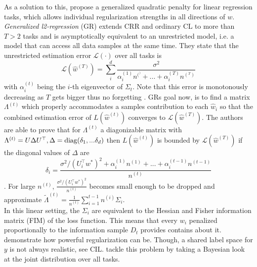 As a solution to this, \cite{zhao2024statisticaltheoryregularizationbasedcontinual} propose a generalized quadratic penalty for linear regression tasks, which allows individual regularization strengths in all directions of $w$.\\
\textit{Generalized l2-regression} (GR) \cite{zhao2024statisticaltheoryregularizationbasedcontinual} extends CRR and ordinary CL to more than $T > 2$ tasks and is asymptotically equivalent to an unrestricted model, i.e. a model that can access all data samples at the same time. They state that the unrestricted estimation error $\mathcal{L}(\cdot)$ over all tasks is
\begin{equation}\label{oracle}
	\mathcal{L}(\hat{w}^{(T)}) = \sum_{i}^{d} \frac{\sigma^2}{\alpha^{(1)}_i n^{(^)}+ ... + \alpha^{(T)}_i n^{(^T)}}
\end{equation}
with $\alpha^{(t)}_i$ being the $i$-th eigenvector of $\Sigma_t$. Note that this error is monotonously decreasing as $T$ gets bigger thus no forgetting \cite{zhao2024statisticaltheoryregularizationbasedcontinual}. GRs goal now, is to find a matrix $\Lambda^{(t)}$ which properly accommodates a samples contribution to each $\hat{w}_i$ so that the combined estimation error of $L(\hat{w}^{(t)})$ converges to $\mathcal{L}(\hat{w}^{(T)})$. The authors are able to prove that for $\Lambda^{(t)}$ a diagonizable matrix with $\Lambda^{(t)} = U \Delta U^\top, \Delta = \operatorname{diag}(\delta_1, ... \delta_d)$ then $L(\hat{w}^{(t)})$ is bounded by $\mathcal{L}(\hat{w}^{(T)})$ if the diagonal values of $\Delta$ are 
\begin{equation}
	\delta_i = \frac{\sigma^2 / (U_i^\top w^*)^2 + \alpha^{(1)}_i n^{(1)} + ... + \alpha^{(t-1)}_i n^{(t-1)}}{n^{(t)}}
\end{equation}. For large $n^{(t)}$, $\frac{\sigma^2 / (U_i^\top w^*)^2}{n^{(t)}}$ becomes small enough to be dropped and \cite{zhao2024statisticaltheoryregularizationbasedcontinual} approximate $\tilde{\Lambda}^{(t)} = \frac{1}{n^{(t)}}\sum_{i = 1}^{t-1} n^{(i)}\Sigma_i$.\\
In this linear setting, the $\Sigma_i$ are equivalent to the Hessian and Fisher information matrix (FIM) of the loss function. This means that every $w_i$ penalized proportionally to the information sample $D_t$ provides contains about it.\\
\cite{zhao2024statisticaltheoryregularizationbasedcontinual} demonstrate how powerful regularization can be. Though, a shared label space for $y$ is not always realistic, see CIL. \cite{JK} tackle this problem by taking a Bayesian look at the joint distribution over all tasks.\\
